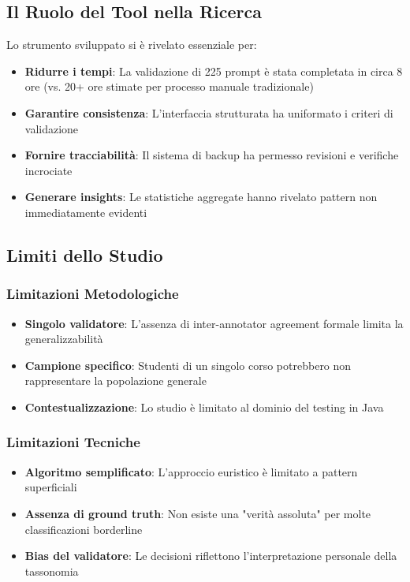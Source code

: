 \documentclass[a4paper,12pt]{article}
\begin{document}
\subsection{Il Ruolo del Tool nella Ricerca}
Lo strumento sviluppato si è rivelato essenziale per:

\begin{itemize}
    \item \textbf{Ridurre i tempi}: La validazione di 225 prompt è stata completata in circa 8 ore (vs. 20+ ore stimate per processo manuale tradizionale)
    \item \textbf{Garantire consistenza}: L'interfaccia strutturata ha uniformato i criteri di validazione
    \item \textbf{Fornire tracciabilità}: Il sistema di backup ha permesso revisioni e verifiche incrociate
    \item \textbf{Generare insights}: Le statistiche aggregate hanno rivelato pattern non immediatamente evidenti
\end{itemize}

\subsection{Limiti dello Studio}

\subsubsection{Limitazioni Metodologiche}
\begin{itemize}
    \item \textbf{Singolo validatore}: L'assenza di inter-annotator agreement formale limita la generalizzabilità
    \item \textbf{Campione specifico}: Studenti di un singolo corso potrebbero non rappresentare la popolazione generale
    \item \textbf{Contestualizzazione}: Lo studio è limitato al dominio del testing in Java
\end{itemize}

\subsubsection{Limitazioni Tecniche}
\begin{itemize}
    \item \textbf{Algoritmo semplificato}: L'approccio euristico è limitato a pattern superficiali
    \item \textbf{Assenza di ground truth}: Non esiste una "verità assoluta" per molte classificazioni borderline
    \item \textbf{Bias del validatore}: Le decisioni riflettono l'interpretazione personale della tassonomia
\end{itemize}
\end{document}
